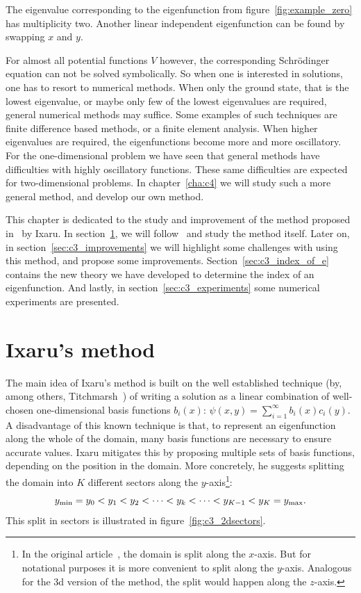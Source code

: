 The eigenvalue corresponding to the eigenfunction from figure~\ref{fig:example_zero} has multiplicity two. Another linear independent eigenfunction can be found by swapping $x$ and $y$.

For almost all potential functions $V$ however, the corresponding Schrödinger equation can not be solved symbolically. So when one is interested in solutions, one has to resort to numerical methods. When only the ground state, that is the lowest eigenvalue, or maybe only few of the lowest eigenvalues are required, general numerical methods may suffice. Some examples of such techniques are finite difference based methods, or a finite element analysis. When higher eigenvalues are required, the eigenfunctions become more and more oscillatory. For the one-dimensional problem we have seen that general methods have difficulties with highly oscillatory functions. These same difficulties are expected for two-dimensional problems. In chapter~\ref{cha:c4} we will study such a more general method, and develop our own method.

This chapter is dedicated to the study and improvement of the method proposed in~\cite{ixaru_new_2010} by Ixaru. In section~\ref{sec:c3_ixarus_method}, we will follow~\cite{ixaru_new_2010} and study the method itself. Later on, in section~\ref{sec:c3_improvements} we will highlight some challenges with using this method, and propose some improvements. Section~\ref{sec:c3_index_of_e} contains the new theory we have developed to determine the index of an eigenfunction. And lastly, in section~\ref{sec:c3_experiments} some numerical experiments are presented.

\section{Ixaru's method}\label{sec:c3_ixarus_method}

The main idea of Ixaru's method is built on the well established technique (by, among others, Titchmarsh~\cite{titchmarsh_eigenfunction_1962}) of writing a solution as a linear combination of well-chosen one-dimensional basis functions $b_i(x)$: $\psi(x, y) = \sum_{i=1}^\infty b_i(x) c_i(y)$. A disadvantage of this known technique is that, to represent an eigenfunction along the whole of the domain, many basis functions are necessary to ensure accurate values. Ixaru mitigates this by proposing multiple sets of basis functions, depending on the position in the domain. More concretely, he suggests splitting the domain into $K$ different sectors along the $y$-axis\footnote{In the original article~\cite{ixaru_new_2010}, the domain is split along the $x$-axis. But for notational purposes it is more convenient to split along the $y$-axis. Analogous for the 3d version of the method, the split would happen along the $z$-axis.}:
$$
  {y_{\text{min}}} = y_0 < y_1 < y_2 < \dots < y_k < \dots < y_{K-1} < y_{K} = {y_{\text{max}}}\text{.}
$$
This split in sectors is illustrated in figure~\ref{fig:c3_2dsectors}.

